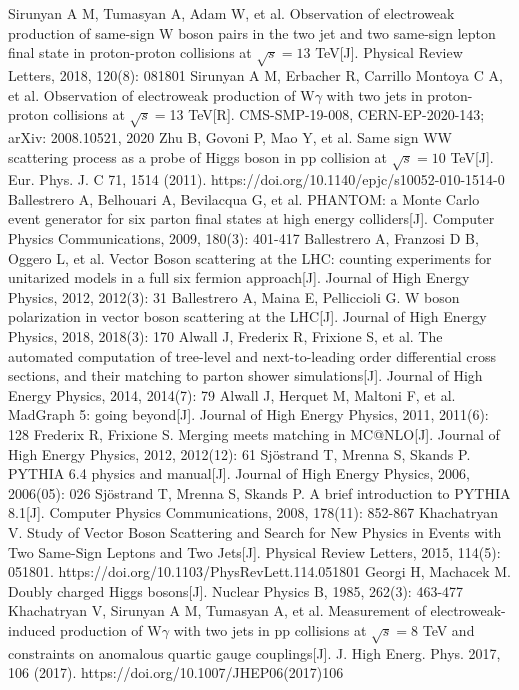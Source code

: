 \documentclass{SCIS2020cn}
\begin{document}
\begin{thebibliography}{99}
 Sirunyan A M, Tumasyan A, Adam W, et al. Observation of electroweak production of same-sign W boson pairs in the two jet and two same-sign lepton final state in proton-proton collisions at $\sqrt{s} = 13$ TeV[J]. Physical Review Letters, 2018, 120(8): 081801
 Sirunyan A M, Erbacher R, Carrillo Montoya C A, et al. Observation of electroweak production of W$\gamma $ with two jets in proton-proton collisions at $\sqrt {s}= $13 TeV[R]. CMS-SMP-19-008, CERN-EP-2020-143; arXiv: 2008.10521, 2020
 Zhu B, Govoni P, Mao Y, et al. Same sign WW scattering process as a probe of Higgs boson in pp collision at $\sqrt {s}= 10$ TeV[J]. Eur. Phys. J. C 71, 1514 (2011). https://doi.org/10.1140/epjc/s10052-010-1514-0
 Ballestrero A, Belhouari A, Bevilacqua G, et al. PHANTOM: a Monte Carlo event generator for six parton final states at high energy colliders[J]. Computer Physics Communications, 2009, 180(3): 401-417
 Ballestrero A, Franzosi D B, Oggero L, et al. Vector Boson scattering at the LHC: counting experiments for unitarized models in a full six fermion approach[J]. Journal of High Energy Physics, 2012, 2012(3): 31
 Ballestrero A, Maina E, Pelliccioli G. W boson polarization in vector boson scattering at the LHC[J]. Journal of High Energy Physics, 2018, 2018(3): 170
 Alwall J, Frederix R, Frixione S, et al. The automated computation of tree-level and next-to-leading order differential cross sections, and their matching to parton shower simulations[J]. Journal of High Energy Physics, 2014, 2014(7): 79
 Alwall J, Herquet M, Maltoni F, et al. MadGraph 5: going beyond[J]. Journal of High Energy Physics, 2011, 2011(6): 128
 Frederix R, Frixione S. Merging meets matching in MC@NLO[J]. Journal of High Energy Physics, 2012, 2012(12): 61
 Sjöstrand T, Mrenna S, Skands P. PYTHIA 6.4 physics and manual[J]. Journal of High Energy Physics, 2006, 2006(05): 026
 Sjöstrand T, Mrenna S, Skands P. A brief introduction to PYTHIA 8.1[J]. Computer Physics Communications, 2008, 178(11): 852-867
 Khachatryan V. Study of Vector Boson Scattering and Search for New Physics in Events with Two Same-Sign Leptons and Two Jets[J]. Physical Review Letters, 2015, 114(5): 051801. https://doi.org/10.1103/PhysRevLett.114.051801
 Georgi H, Machacek M. Doubly charged Higgs bosons[J]. Nuclear Physics B, 1985, 262(3): 463-477
 Khachatryan V, Sirunyan A M, Tumasyan A, et al. Measurement of electroweak-induced production of W$\gamma$ with two jets in pp collisions at $\sqrt {s}= 8$ TeV and constraints on anomalous quartic gauge couplings[J]. J. High Energ. Phys. 2017, 106 (2017). https://doi.org/10.1007/JHEP06(2017)106

\end{thebibliography}
\end{document}

